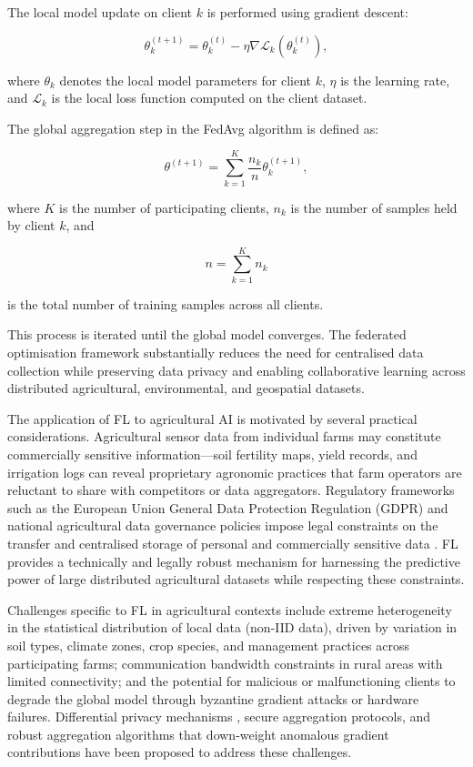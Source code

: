 \documentclass[land,article,submit,pdftex,moreauthors]{Definitions/mdpi}
\numberwithin{equation}{section}
\begin{document}
The local model update on client $k$ is performed using gradient descent:

\begin{equation}
\theta_k^{(t+1)}
=
\theta_k^{(t)}
-
\eta
\nabla \mathcal{L}_k(\theta_k^{(t)}),
\end{equation}

where $\theta_k$ denotes the local model parameters for client $k$, $\eta$ is the learning rate, and $\mathcal{L}_k$ is the local loss function computed on the client dataset.

The global aggregation step in the FedAvg algorithm is defined as:

\begin{equation}
\theta^{(t+1)}
=
\sum_{k=1}^{K}
\frac{n_k}{n}
\theta_k^{(t+1)},
\end{equation}

where $K$ is the number of participating clients, $n_k$ is the number of samples held by client $k$, and

\begin{equation}
n=\sum_{k=1}^{K} n_k
\end{equation}

is the total number of training samples across all clients.

This process is iterated until the global model converges. The federated optimisation framework substantially reduces the need for centralised data collection while preserving data privacy and enabling collaborative learning across distributed agricultural, environmental, and geospatial datasets.

The application of FL to agricultural AI is motivated by several practical considerations. Agricultural sensor data from individual farms may constitute commercially sensitive information---soil fertility maps, yield records, and irrigation logs can reveal proprietary agronomic practices that farm operators are reluctant to share with competitors or data aggregators. Regulatory frameworks such as the European Union General Data Protection Regulation (GDPR) and national agricultural data governance policies impose legal constraints on the transfer and centralised storage of personal and commercially sensitive data \citep{regulation2016eu}. FL provides a technically and legally robust mechanism for harnessing the predictive power of large distributed agricultural datasets while respecting these constraints.

Challenges specific to FL in agricultural contexts include extreme heterogeneity in the statistical distribution of local data (non-IID data), driven by variation in soil types, climate zones, crop species, and management practices across participating farms; communication bandwidth constraints in rural areas with limited connectivity; and the potential for malicious or malfunctioning clients to degrade the global model through byzantine gradient attacks or hardware failures. Differential privacy mechanisms \citep{dwork2014algorithmic}, secure aggregation protocols, and robust aggregation algorithms that down-weight anomalous gradient contributions have been proposed to address these challenges.
\end{document}
